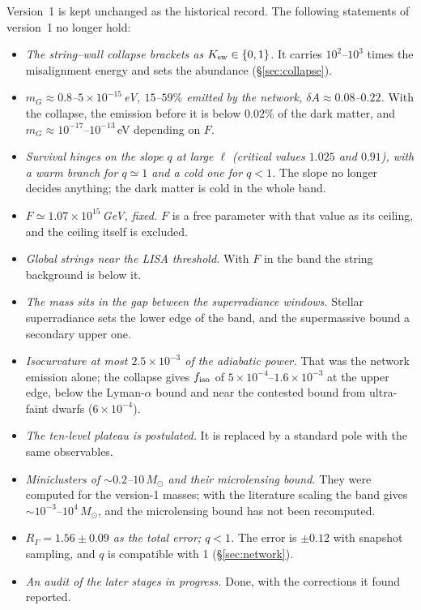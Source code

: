 \documentclass[11pt,a4paper]{article}
\newcommand{\RG}{R_\Gamma}
\newcommand{\dA}{\delta A}
\begin{document}
Version~1 is kept unchanged as the historical record.
The following statements of version~1 no longer hold:
\begin{itemize}
\item \emph{The string--wall collapse brackets as $K_{\rm sw}\in\{0,1\}$.} It carries $10^2$--$10^3$ times the misalignment energy and sets the abundance (\S\ref{sec:collapse}).
\item \emph{$m_G\approx0.8$--$5\times10^{-15}$\,eV, $15$--$59\%$ emitted by the network, $\dA\approx0.08$--$0.22$.} With the collapse, the emission before it is below $0.02\%$ of the dark matter, and $m_G\approx10^{-17}$--$10^{-13}$\,eV depending on $F$.
\item \emph{Survival hinges on the slope $q$ at large $\ell$ (critical values $1.025$ and $0.91$), with a warm branch for $q\simeq1$ and a cold one for $q<1$.} The slope no longer decides anything; the dark matter is cold in the whole band.
\item \emph{$F\simeq1.07\times10^{15}$\,GeV, fixed.} $F$ is a free parameter with that value as its ceiling, and the ceiling itself is excluded.
\item \emph{Global strings near the LISA threshold.} With $F$ in the band the string background is below it.
\item \emph{The mass sits in the gap between the superradiance windows.} Stellar superradiance sets the lower edge of the band, and the supermassive bound a secondary upper one.
\item \emph{Isocurvature at most $2.5\times10^{-3}$ of the adiabatic power.} That was the network emission alone; the collapse gives $f_{\rm iso}$ of $5\times10^{-4}$--$1.6\times10^{-3}$ at the upper edge, below the Lyman-$\alpha$ bound and near the contested bound from ultra-faint dwarfs ($6\times10^{-4}$).
\item \emph{The ten-level plateau is postulated.} It is replaced by a standard pole with the same observables.
\item \emph{Miniclusters of $\sim0.2$--$10\,M_\odot$ and their microlensing bound.} They were computed for the version-1 masses; with the literature scaling the band gives $\sim10^{-3}$--$10^4\,M_\odot$, and the microlensing bound has not been recomputed.
\item \emph{$\RG=1.56\pm0.09$ as the total error; $q<1$.} The error is $\pm0.12$ with snapshot sampling, and $q$ is compatible with 1 (\S\ref{sec:network}).
\item \emph{An audit of the later stages in progress.} Done, with the corrections it found reported.
\end{itemize}
\end{document}
